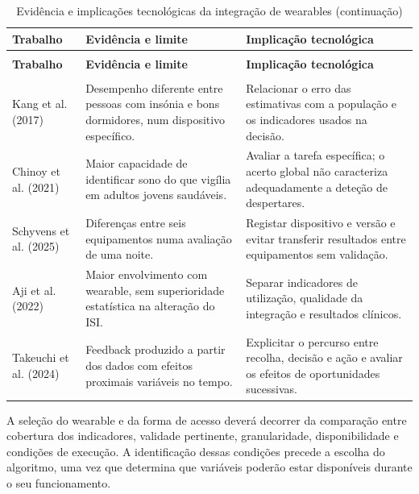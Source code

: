 \begingroup
\small
\renewcommand{\arraystretch}{1.15}
\begin{xltabular}{\textwidth}{@{}>{\raggedright\arraybackslash}p{2.4cm}>{\raggedright\arraybackslash}X>{\raggedright\arraybackslash}X@{}}
\caption{Evidência e implicações tecnológicas da integração de wearables}\label{tab:useOfWearable}\\
\toprule
\textbf{Trabalho} & \textbf{Evidência e limite} & \textbf{Implicação tecnológica}\\ \midrule
\endfirsthead
\caption[]{Evidência e implicações tecnológicas da integração de wearables (continuação)}\\
\toprule
\textbf{Trabalho} & \textbf{Evidência e limite} & \textbf{Implicação tecnológica}\\ \midrule
\endhead
\midrule{}\\
\endfoot
\bottomrule
\endlastfoot
Kang et al. (2017) & Desempenho diferente entre pessoas com insónia e bons dormidores, num dispositivo específico. & Relacionar o erro das estimativas com a população e os indicadores usados na decisão.\\ \midrule
Chinoy et al. (2021) & Maior capacidade de identificar sono do que vigília em adultos jovens saudáveis. & Avaliar a tarefa específica; o acerto global não caracteriza adequadamente a deteção de despertares.\\ \midrule
Schyvens et al. (2025) & Diferenças entre seis equipamentos numa avaliação de uma noite. & Registar dispositivo e versão e evitar transferir resultados entre equipamentos sem validação.\\ \midrule
Aji et al. (2022) & Maior envolvimento com wearable, sem superioridade estatística na alteração do ISI. & Separar indicadores de utilização, qualidade da integração e resultados clínicos.\\ \midrule
Takeuchi et al. (2024) & Feedback produzido a partir dos dados com efeitos proximais variáveis no tempo. & Explicitar o percurso entre recolha, decisão e ação e avaliar os efeitos de oportunidades sucessivas.\\
\end{xltabular}
\endgroup

A seleção do wearable e da forma de acesso deverá decorrer da comparação entre cobertura dos indicadores, validade pertinente, granularidade, disponibilidade e condições de execução. A identificação dessas condições precede a escolha do algoritmo, uma vez que determina que variáveis poderão estar disponíveis durante o seu funcionamento.

